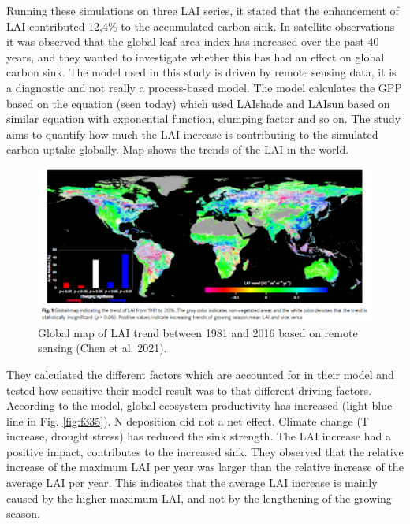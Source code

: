 \documentclass[12pt,oneside]{book}
\begin{document}
Running these simulations on three LAI series, it stated that the
enhancement of LAI contributed 12,4\% to the accumulated carbon sink. In
satellite observations it was observed that the global leaf area index
has increased over the past 40 years, and they wanted to investigate
whether this has had an effect on global carbon sink. The model used in
this study is driven by remote sensing data, it is a diagnostic and not
really a process-based model. The model calculates the GPP based on the
equation (seen today) which used LAIshade and LAIsun based on similar
equation with exponential function, clumping factor and so on. The study
aims to quantify how much the LAI increase is contributing to the
simulated carbon uptake globally. Map shows the trends of the LAI in the
world.

\begin{figure}

{\centering \includegraphics[width=0.8\linewidth]{figures/chap3/f334_chen1} 

}

\caption{Global map of LAI trend between 1981 and 2016 based on remote sensing (Chen et al. 2021).}\label{fig:f334}
\end{figure}

They calculated the different factors which are accounted for in their
model and tested how sensitive their model result was to that different
driving factors. According to the model, global ecosystem productivity
has increased (light blue line in Fig. \ref{fig:f335}). N deposition did
not a net effect. Climate change (T increase, drought stress) has
reduced the sink strength. The LAI increase had a positive impact,
contributes to the increased sink. They observed that the relative
increase of the maximum LAI per year was larger than the relative
increase of the average LAI per year. This indicates that the average
LAI increase is mainly caused by the higher maximum LAI, and not by the
lengthening of the growing season.
\end{document}
